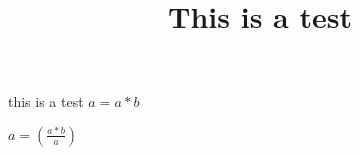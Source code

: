 \documentclass{article}
\title{This is a test}
\begin{document}
this is a test
$a=a*b$

\( a= \left(\frac{a*b}{a} \right) \)
\end{document}
